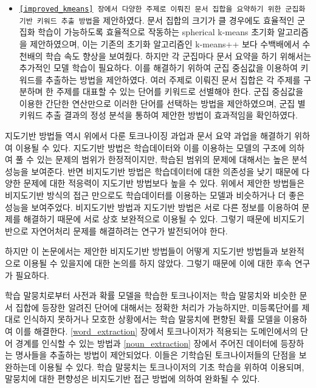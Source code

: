 \documentclass[11pt]{article}
\begin{document}
\begin{itemize}
  \item \texttt{\ref{improved_kmeans} 장에서 다양한 주제로 이뤄진 문서 집합을 요약하기 위한 군집화 기반 키워드 추출 방법}을 제안하였다. 문서 집합의 크기가 클 경우에도 효율적인 군집화 학습이 가능하도록 효율적으로 작동하는 spherical k-means 초기화 알고리즘을 제안하였으며, 이는 기존의 초기화 알고리즘인 k-means++ 보다 수백배에서 수천배의 학습 속도 향상을 보여줬다. 하지만 각 군집마다 문서 요약을 하기 위해서는 추가적인 모델 학습이 필요하다. 이를 해결하기 위하여 군집 중심값을 이용하여 키워드를 추출하는 방법을 제안하였다. 여러 주제로 이뤄진 문서 집합은 각 주제를 구분하며 한 주제를 대표할 수 있는 단어를 키워드로 선별해야 한다. 군집 중심값을 이용한 간단한 연산만으로 이러한 단어를 선택하는 방법을 제안하였으며, 군집 별 키워드 추출 결과의 정성 분석을 통하여 제안한 방법이 효과적임을 확인하였다.
\end{itemize}

지도기반 방법들 역시 위에서 다룬 토크나이징 과업과 문서 요약 과업을 해결하기 위하여 이용될 수 있다.
지도기반 방법은 학습데이터와 이를 이용하는 모델의 구조에 의하여 풀 수 있는 문제의 범위가 한정적이지만, 학습된 범위의 문제에 대해서는 높은 분석 성능을 보여준다.
반면 비지도기반 방법은 학습데이터에 대한 의존성을 낮기 때문에 다양한 문제에 대한 적응력이 지도기반 방법보다 높을 수 있다.
위에서 제안한 방법들은 비지도기반 방식의 접근 만으로도 학습데이터를 이용하는 모델과 비슷하거나 더 좋은 성능을 보여주었다.
비지도기반 방법과 지도기반 방법은 서로 다른 정보를 이용하여 문제를 해결하기 때문에 서로 상호 보완적으로 이용될 수 있다.
그렇기 때문에 비지도기반으로 자연어처리 문제를 해결하려는 연구가 발전되어야 한다.

하지만 이 논문에서는 제안한 비지도기반 방법들이 어떻게 지도기반 방법들과 보완적으로 이용될 수 있을지에 대한 논의를 하지 않았다.
그렇기 때문에 이에 대한 후속 연구가 필요하다.

학습 말뭉치로부터 사전과 확률 모델을 학습한 토크나이저는 학습 말뭉치와 비슷한 문서 집합에 등장한 알려진 단어에 대해서는 정확한 처리가 가능하지만, 미등록단어를 제대로 인식하지 못하거나 모호한 상황에서는 학습 말뭉치에 편향된 확률 모델을 이용하여 이를 해결한다.
\ref{word_extraction} 장에서 토크나이저가 적용되는 도메인에서의 단어 경계를 인식할 수 있는 방법과 \ref{noun_extraction} 장에서 주어진 데이터에 등장하는 명사들을 추출하는 방법이 제안되었다.
이들은 기학습된 토크나이저들의 단점을 보완하는데 이용될 수 있다.
학습 말뭉치는 토크나이저의 기초 학습을 위하여 이용되며, 말뭉치에 대한 편향성은 비지도기반 접근 방법에 의하여 완화될 수 있다.
\end{document}
